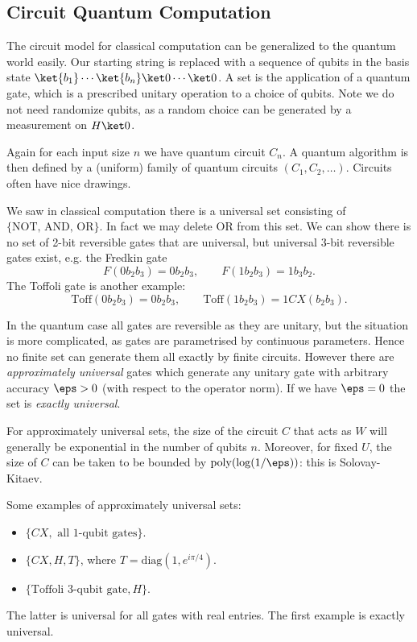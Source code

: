 \documentclass[12pt]{article}
\begin{document}
\subsection{Circuit Quantum Computation}
\label{sub:cqc}

The circuit model for classical computation can be generalized to the quantum world easily. Our starting string is replaced with a sequence of qubits in the basis state $\ket{b_1} \cdots \ket{b_n} \ket 0 \cdots \ket 0$. A set is the application of a quantum gate, which is a prescribed unitary operation to a choice of qubits. Note we do not need randomize qubits, as a random choice can be generated by a measurement on $H \ket 0$.

Again for each input size $n$ we have quantum circuit $C_n$. A quantum algorithm is then defined by a (uniform) family of quantum circuits $(C_1, C_2, \ldots)$. Circuits often have nice drawings.

We saw in classical computation there is a universal set consisting of $\{\text{NOT, AND, OR}\}$. In fact we may delete OR from this set. We can show there is no set of 2-bit reversible gates that are universal, but universal 3-bit reversible gates exist, e.g. the Fredkin gate
\[
F(0b_2b_3) = 0b_2b_3, \qquad F(1b_2b_3) = 1b_3b_2.
\]
The Toffoli gate is another example:
\[
\mathrm{Toff}(0b_2b_3) = 0b_2b_3, \qquad \mathrm{Toff}(1b_2b_3) = 1 CX(b_2b_3).
\]

In the quantum case all gates are reversible as they are unitary, but the situation is more complicated, as gates are parametrised by continuous parameters. Hence no finite set can generate them all exactly by finite circuits. However there are \emph{approximately universal} gates which generate any unitary gate with arbitrary accuracy $\eps > 0$ (with respect to the operator norm). If we have $\eps = 0$ the set is \emph{exactly universal}.

For approximately universal sets, the size of the circuit $C$ that acts as $W$ will generally be exponential in the number of qubits $n$. Moreover, for fixed $U$, the size of $C$ can be taken to be bounded by $\mathrm{poly}(\log(1/\eps))$: this is Solovay-Kitaev.

\begin{exbox}
	Some examples of approximately universal sets:
	\begin{itemize}
		\item $\{CX, \text{ all 1-qubit gates}\}$.
		\item $\{CX, H, T\}$, where $T = \mathrm{diag}(1, e^{i\pi/4})$.
		\item $\{\text{Toffoli 3-qubit gate}, H\}$.
	\end{itemize}
	The latter is universal for all gates with real entries. The first example is exactly universal.
\end{exbox}
\end{document}
